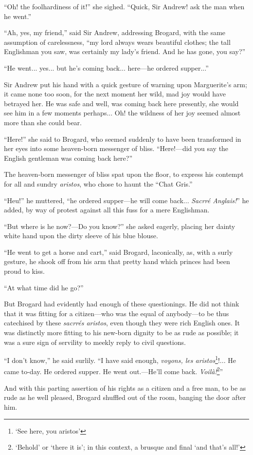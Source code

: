 \enquote{Oh! the foolhardiness of it!} she sighed. \enquote{Quick, Sir Andrew! ask the man when he went.}

\enquote{Ah, yes, my friend,} said Sir Andrew, addressing Brogard, with the same assumption of carelessness, \enquote{my lord always wears beautiful clothes; the tall Englishman you saw, was certainly my lady's friend. And he has gone, you say?}

\enquote{He went... yes... but he's coming back... here---he ordered supper...}

Sir Andrew put his hand with a quick gesture of warning upon Marguerite's arm; it came none too soon, for the next moment her wild, mad joy would have betrayed her. He was safe and well, was coming back here presently, she would see him in a few moments perhaps... Oh! the wildness of her joy seemed almost more than she could bear.

\enquote{Here!} she said to Brogard, who seemed suddenly to have been transformed in her eyes into some heaven-born messenger of bliss. \enquote{Here!---did you say the English gentleman was coming back here?}

The heaven-born messenger of bliss spat upon the floor, to express his contempt for all and sundry \textit{aristos}, who chose to haunt the \enquote{Chat Gris.}

\enquote{Heu!} he muttered, \enquote{he ordered supper---he will come back... \textit{Sacrré Anglais!}} he added, by way of protest against all this fuss for a mere Englishman.

\enquote{But where is he now?---Do you know?} she asked eagerly, placing her dainty white hand upon the dirty sleeve of his blue blouse.

\enquote{He went to get a horse and cart,} said Brogard, laconically, as, with a surly gesture, he shook off from his arm that pretty hand which princes had been proud to kiss.

\enquote{At what time did he go?}

But Brogard had evidently had enough of these questionings. He did not think that it was fitting for a citizen---who was the equal of anybody---to be thus catechised by these \textit{sacrrés aristos}, even though they were rich English ones. It was distinctly more fitting to his new-born dignity to be as rude as possible; it was a sure sign of servility to meekly reply to civil questions.

\enquote{I don't know,} he said surlily. \enquote{I have said enough, \textit{voyons, les aristos}\footnote{\enquote{See here, you aristos}}!... He came to-day. He ordered supper. He went out.---He'll come back. \textit{Voilà!}\footnote{\enquote{Behold} or \enquote{there it is}; in this context, a brusque and final \enquote{and that's all!}}}

And with this parting assertion of his rights as a citizen and a free man, to be as rude as he well pleased, Brogard shuffled out of the room, banging the door after him.